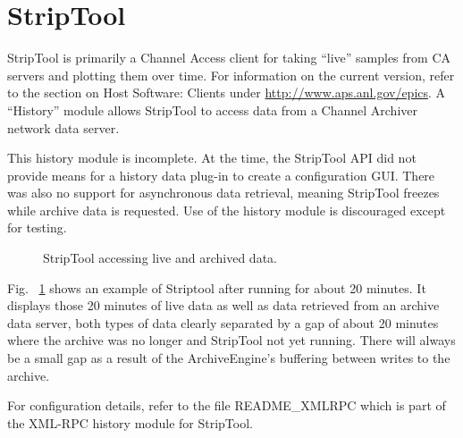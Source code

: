 \section{StripTool}
StripTool is primarily a Channel Access client for taking ``live''
samples from CA servers and plotting them over time.
For information on the current version, refer to the section on Host
Software: Clients under
\href{http://www.aps.anl.gov/epics}{http://www.aps.anl.gov/epics}.
A ``History'' module allows StripTool to access
data from a Channel Archiver network data server.

\NOTE This history module is incomplete. At the time, the StripTool API
did not provide means for a history data plug-in to create a configuration
GUI. There was also no support for asynchronous data retrieval,
meaning StripTool freezes while archive data is requested.
Use of the history module is discouraged except for testing.

\medskip

\begin{figure}[htb]
\begin{center}
\end{center}
\caption{\label{fig:striptool}StripTool accessing live and archived data.}
\end{figure}

\noindent Fig.~ \ref{fig:striptool} shows an example of Striptool after running
for about 20 minutes. It displays those 20 minutes of live data as
well as data retrieved from an archive data server, both types of data
clearly separated by a gap of about 20 minutes where the archive was
no longer and StripTool not yet running.
There will always be a small gap as a result of the ArchiveEngine's
buffering between writes to the archive.

For configuration details, refer to the file README\_XMLRPC which is
part of the XML-RPC history module for StripTool.
